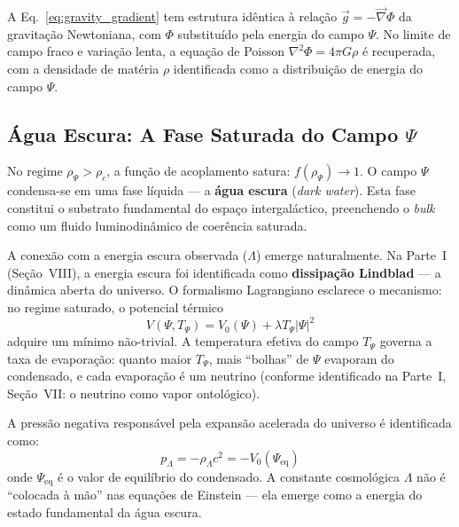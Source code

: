 \documentclass[12pt,a4paper,twoside]{article}
\newcommand{\Psifield}{\Psi}
\newcommand{\bulk}{\textit{bulk}}
\begin{document}
A Eq.~\eqref{eq:gravity_gradient} tem estrutura id\^entica \`a rela\c{c}\~ao $\vec{g} = -\vec{\nabla}\Phi$ da gravita\c{c}\~ao Newtoniana, com $\Phi$ substitu\'ido pela energia do campo $\Psifield$. No limite de campo fraco e varia\c{c}\~ao lenta, a equa\c{c}\~ao de Poisson $\nabla^2\Phi = 4\pi G\rho$ \'e recuperada, com a densidade de mat\'eria $\rho$ identificada como a distribui\c{c}\~ao de energia do campo $\Psifield$.


\subsection{\'Agua Escura: A Fase Saturada do Campo $\Psifield$}
\label{sec:dark_water}


No regime $\rho_\Psifield > \rho_c$, a fun\c{c}\~ao de acoplamento satura: $f(\rho_\Psifield) \to 1$. O campo $\Psifield$ condensa-se em uma fase l\'iquida --- a \textbf{\'agua escura} (\textit{dark water}). Esta fase constitui o substrato fundamental do espa\c{c}o intergal\'actico, preenchendo o \bulk{} como um fluido luminodin\^amico de coer\^encia saturada.

A conex\~ao com a energia escura observada ($\Lambda$) emerge naturalmente. Na Parte~I (Se\c{c}\~ao~VIII), a energia escura foi identificada como \textbf{dissipa\c{c}\~ao Lindblad} --- a din\^amica aberta do universo. O formalismo Lagrangiano esclarece o mecanismo: no regime saturado, o potencial t\'ermico
\begin{equation}
V(\Psifield, T_\Psifield) = V_0(\Psifield) + \lambda T_\Psifield |\Psifield|^2
\label{eq:thermal_potential}
\end{equation}
adquire um m\'inimo n\~ao-trivial. A temperatura efetiva do campo $T_\Psifield$ governa a taxa de evapora\c{c}\~ao: quanto maior $T_\Psifield$, mais ``bolhas'' de $\Psifield$ evaporam do condensado, e cada evapora\c{c}\~ao \'e um neutrino (conforme identificado na Parte~I, Se\c{c}\~ao~VII: o neutrino como vapor ontol\'ogico).



A press\~ao negativa respons\'avel pela expans\~ao acelerada do universo \'e identificada como:
\begin{equation}
p_\Lambda = -\rho_\Lambda c^2 = -V_0(\Psifield_{\text{eq}})
\label{eq:dark_pressure}
\end{equation}
onde $\Psifield_{\text{eq}}$ \'e o valor de equil\'ibrio do condensado. A constante cosmol\'ogica $\Lambda$ n\~ao \'e ``colocada \`a m\~ao'' nas equa\c{c}\~oes de Einstein --- ela emerge como a energia do estado fundamental da \'agua escura.
\end{document}
